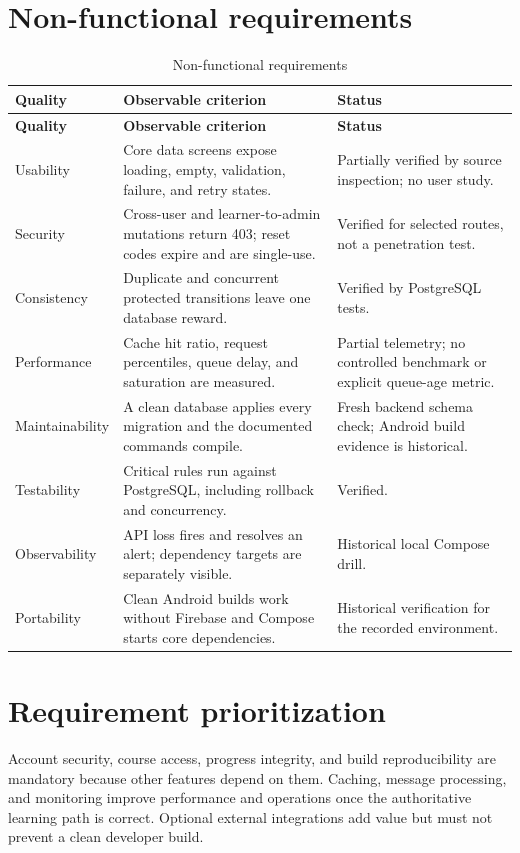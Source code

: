 \documentclass[12pt,a4paper,oneside]{report}
\begin{document}
\section{Non-functional requirements}
\begin{longtable}{P{0.20\textwidth}P{0.48\textwidth}P{0.21\textwidth}}
\caption{Non-functional requirements}\\\toprule
\textbf{Quality} & \textbf{Observable criterion} & \textbf{Status}\\\midrule\endfirsthead
\toprule\textbf{Quality} & \textbf{Observable criterion} & \textbf{Status}\\\midrule\endhead
Usability & Core data screens expose loading, empty, validation, failure, and retry states. & Partially verified by source inspection; no user study.\\
Security & Cross-user and learner-to-admin mutations return 403; reset codes expire and are single-use. & Verified for selected routes, not a penetration test.\\
Consistency & Duplicate and concurrent protected transitions leave one database reward. & Verified by PostgreSQL tests.\\
Performance & Cache hit ratio, request percentiles, queue delay, and saturation are measured. & Partial telemetry; no controlled benchmark or explicit queue-age metric.\\
Maintainability & A clean database applies every migration and the documented commands compile. & Fresh backend schema check; Android build evidence is historical.\\
Testability & Critical rules run against PostgreSQL, including rollback and concurrency. & Verified.\\
Observability & API loss fires and resolves an alert; dependency targets are separately visible. & Historical local Compose drill.\\
Portability & Clean Android builds work without Firebase and Compose starts core dependencies. & Historical verification for the recorded environment.\\
\bottomrule
\end{longtable}

\section{Requirement prioritization}
Account security, course access, progress integrity, and build reproducibility are
mandatory because other features depend on them. Caching, message processing, and
monitoring improve performance and operations once the authoritative learning path
is correct. Optional external integrations add value but must not prevent a clean
developer build.
\end{document}

